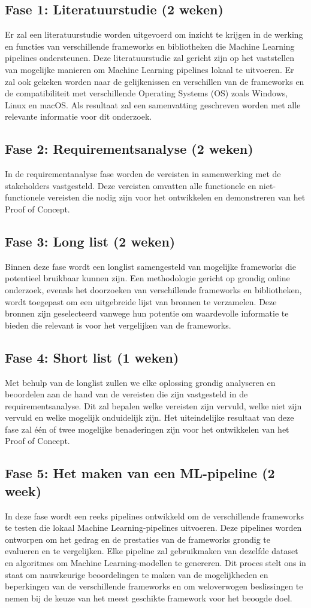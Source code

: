 \subsection{Fase 1: Literatuurstudie (2 weken)}
Er zal een literatuurstudie worden uitgevoerd om inzicht te krijgen in de werking en
functies van verschillende frameworks en bibliotheken die Machine Learning pipelines ondersteunen.
Deze literatuurstudie zal gericht zijn op het vaststellen van mogelijke manieren om Machine Learning pipelines lokaal te uitvoeren. Er zal ook gekeken worden naar de gelijkenissen en verschillen van de frameworks en de compatibiliteit met verschillende Operating Systems (OS) zoals Windows, Linux en macOS.
Als resultaat zal een samenvatting geschreven worden met alle relevante informatie voor dit onderzoek.
\subsection{Fase 2: Requirementsanalyse (2 weken)}
In de requirementanalyse fase worden de vereisten in samenwerking met de stakeholders vastgesteld. Deze vereisten omvatten alle functionele en niet-functionele vereisten die nodig zijn voor het ontwikkelen en demonstreren van het Proof of Concept.
\subsection{Fase 3: Long list (2 weken)}
Binnen deze fase wordt een longlist samengesteld van mogelijke frameworks die potentieel bruikbaar kunnen zijn. Een methodologie gericht op grondig online onderzoek, evenals het doorzoeken van verschillende frameworks en bibliotheken, wordt toegepast om een uitgebreide lijst van bronnen te verzamelen. Deze bronnen zijn geselecteerd vanwege hun potentie om waardevolle informatie te bieden die relevant is voor het vergelijken van de frameworks.
\subsection{Fase 4: Short list (1 weken)}
Met behulp van de longlist zullen we elke oplossing grondig analyseren en beoordelen aan de hand van de vereisten die zijn vastgesteld in de requirementsanalyse. Dit zal bepalen welke vereisten zijn vervuld, welke niet zijn vervuld en welke mogelijk onduidelijk zijn. Het uiteindelijke resultaat van deze fase zal één of twee mogelijke benaderingen zijn voor het ontwikkelen van het Proof of Concept.
\subsection{Fase 5: Het maken van een ML-pipeline (2 week)}
In deze fase wordt een reeks pipelines ontwikkeld om de verschillende frameworks te testen die lokaal Machine Learning-pipelines uitvoeren. Deze pipelines worden ontworpen om het gedrag en de prestaties van de frameworks grondig te evalueren en te vergelijken. Elke pipeline zal gebruikmaken van dezelfde dataset en algoritmes om Machine Learning-modellen te genereren. Dit proces stelt ons in staat om nauwkeurige beoordelingen te maken van de mogelijkheden en beperkingen van de verschillende frameworks en om weloverwogen beslissingen te nemen bij de keuze van het meest geschikte framework voor het beoogde doel.
